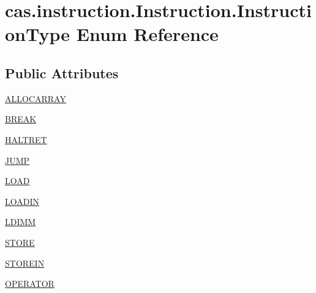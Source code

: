 \hypertarget{enumcas_1_1instruction_1_1_instruction_1_1_instruction_type}{\section{cas.\-instruction.\-Instruction.\-Instruction\-Type Enum Reference}
\label{enumcas_1_1instruction_1_1_instruction_1_1_instruction_type}
}
\subsection*{Public Attributes}
\begin{DoxyCompactItemize}
\item 
\hyperlink{enumcas_1_1instruction_1_1_instruction_1_1_instruction_type_af90144b750051cd8d5e553f6b4a32648}{A\-L\-L\-O\-C\-A\-R\-R\-A\-Y}
\item 
\hyperlink{enumcas_1_1instruction_1_1_instruction_1_1_instruction_type_a10b70f82bf286acf173af1e1de7fc49d}{B\-R\-E\-A\-K}
\item 
\hyperlink{enumcas_1_1instruction_1_1_instruction_1_1_instruction_type_a454ae7507754cd4b6729e60caf86da76}{H\-A\-L\-T\-R\-E\-T}
\item 
\hyperlink{enumcas_1_1instruction_1_1_instruction_1_1_instruction_type_a3a302b47b2da6030ba037a906debfadb}{J\-U\-M\-P}
\item 
\hyperlink{enumcas_1_1instruction_1_1_instruction_1_1_instruction_type_aaf486500c4071599d51ce19e30fbac3a}{L\-O\-A\-D}
\item 
\hyperlink{enumcas_1_1instruction_1_1_instruction_1_1_instruction_type_aabaf7373b5f6e61e80ee49c7ee7800c7}{L\-O\-A\-D\-I\-N}
\item 
\hyperlink{enumcas_1_1instruction_1_1_instruction_1_1_instruction_type_ac58636d9948b738cb61b9a23c9701134}{L\-D\-I\-M\-M}
\item 
\hyperlink{enumcas_1_1instruction_1_1_instruction_1_1_instruction_type_a87f0dc1a1f36d5ed9372f7b9c41faf66}{S\-T\-O\-R\-E}
\item 
\hyperlink{enumcas_1_1instruction_1_1_instruction_1_1_instruction_type_a50d5585e30a38ecf7db248dea8604f44}{S\-T\-O\-R\-E\-I\-N}
\item 
\hyperlink{enumcas_1_1instruction_1_1_instruction_1_1_instruction_type_ad568056ea907e293807a1a63511b2cd1}{O\-P\-E\-R\-A\-T\-O\-R}
\end{DoxyCompactItemize}



